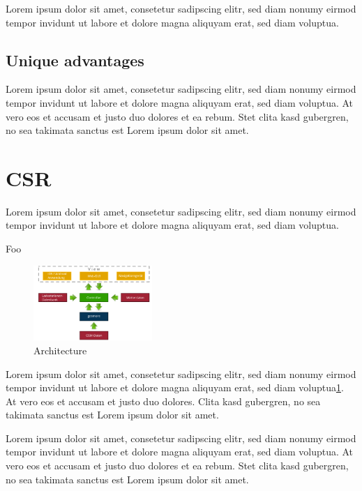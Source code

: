 \documentclass{application}
\makeatletter
\renewcommand{\paragraph}{
  \@startsection{paragraph}{4}
    {\z@}{1.25ex \@plus 1ex \@minus .2ex}{-1em}
      {\normalfont\normalsize\bfseries}
      }
\makeatother
\begin{document}
Lorem ipsum dolor sit amet, consetetur sadipscing elitr, sed diam nonumy
eirmod tempor invidunt ut labore et dolore magna aliquyam erat, sed diam
voluptua. 

\subsection*{Unique advantages}
Lorem ipsum dolor sit amet, consetetur sadipscing elitr, sed diam nonumy
eirmod tempor invidunt ut labore et dolore magna aliquyam erat, sed diam
voluptua. At vero eos et accusam et justo duo dolores et ea rebum. Stet
clita kasd gubergren, no sea takimata sanctus est Lorem ipsum dolor sit
amet.


\section*{CSR}
Lorem ipsum dolor sit amet, consetetur sadipscing elitr, sed diam nonumy
eirmod tempor invidunt ut labore et dolore magna aliquyam erat, sed diam
voluptua. 

\paragraph{Foo}
\begin{figure}[h]
        \centering
        \includegraphics[width=0.4\textwidth]{images/BlockDiagram}
        \caption{Architecture}
        \label{fig:archDiagram}
\end{figure}

Lorem ipsum dolor sit amet, consetetur sadipscing elitr, sed diam nonumy
eirmod tempor invidunt ut labore et dolore magna aliquyam erat, sed diam
voluptua\ref{fig:archDiagram}. At vero eos et accusam et justo duo dolores.
Clita kasd gubergren, no sea takimata sanctus est Lorem ipsum dolor sit
amet.

Lorem ipsum dolor sit amet, consetetur sadipscing elitr, sed diam nonumy
eirmod tempor invidunt ut labore et dolore magna aliquyam erat, sed diam
voluptua. At vero eos et accusam et justo duo dolores et ea rebum. Stet
clita kasd gubergren, no sea takimata sanctus est Lorem ipsum dolor sit
amet.
\end{document}
